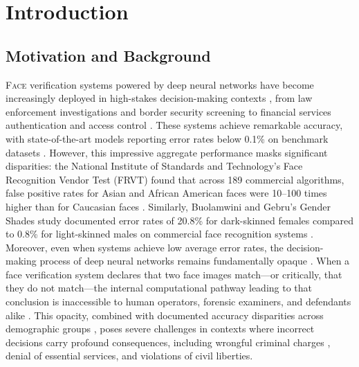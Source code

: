 \chapter{Introduction}
\label{ch:introduction}

\section{Motivation and Background}
\label{sec:motivation}

\lettrine[lines=2,slope=4pt,findent=-3pt]{F}{ace} verification systems powered by deep neural networks have become increasingly deployed in high-stakes decision-making contexts \cite{garvie2016perpetual}, from law enforcement investigations and border security screening to financial services authentication and access control \cite{grother2019frvt}. These systems achieve remarkable accuracy, with state-of-the-art models reporting error rates below 0.1\% on benchmark datasets \cite{deng2019arcface,wang2018cosface}. However, this impressive aggregate performance masks significant disparities: the National Institute of Standards and Technology's Face Recognition Vendor Test (FRVT) found that across 189 commercial algorithms, false positive rates for Asian and African American faces were 10--100 times higher than for Caucasian faces \cite{grother2019frvt}. Similarly, Buolamwini and Gebru's Gender Shades study documented error rates of 20.8\% for dark-skinned females compared to 0.8\% for light-skinned males on commercial face recognition systems \cite{buolamwini2018gender}. Moreover, even when systems achieve low average error rates, the decision-making process of deep neural networks remains fundamentally opaque \cite{lipton2018mythos,castelvecchi2016blackbox}. When a face verification system declares that two face images match---or critically, that they do not match---the internal computational pathway leading to that conclusion is inaccessible to human operators, forensic examiners, and defendants alike \cite{rudin2019stop}. This opacity, combined with documented accuracy disparities across demographic groups \cite{klare2012demographic,phillips2011intro,buolamwini2018gender}, poses severe challenges in contexts where incorrect decisions carry profound consequences, including wrongful criminal charges \cite{hill2020detroit,hill2023pregnant,parks2019wrongful}, denial of essential services, and violations of civil liberties.

